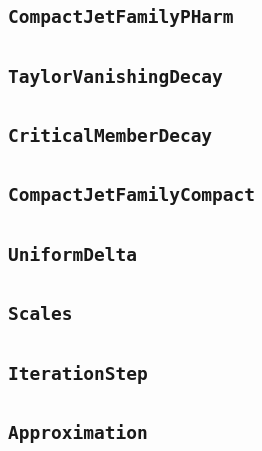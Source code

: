 \documentclass[11pt]{amsart}
\theoremstyle{definition}
\begin{document}
\subsection{\texorpdfstring{\texttt{CompactJetFamilyPHarm}}{CompactJetFamilyPHarm}}\label{node:CompactJetFamilyPHarm}


\subsection{\texorpdfstring{\texttt{TaylorVanishingDecay}}{TaylorVanishingDecay}}\label{node:TaylorVanishingDecay}


\subsection{\texorpdfstring{\texttt{CriticalMemberDecay}}{CriticalMemberDecay}}\label{node:CriticalMemberDecay}


\subsection{\texorpdfstring{\texttt{CompactJetFamilyCompact}}{CompactJetFamilyCompact}}\label{node:CompactJetFamilyCompact}


\subsection{\texorpdfstring{\texttt{UniformDelta}}{UniformDelta}}\label{node:UniformDelta}


\subsection{\texorpdfstring{\texttt{Scales}}{Scales}}\label{node:Scales}


\subsection{\texorpdfstring{\texttt{IterationStep}}{IterationStep}}\label{node:IterationStep}


\subsection{\texorpdfstring{\texttt{Approximation}}{Approximation}}\label{node:Approximation}

\end{document}
